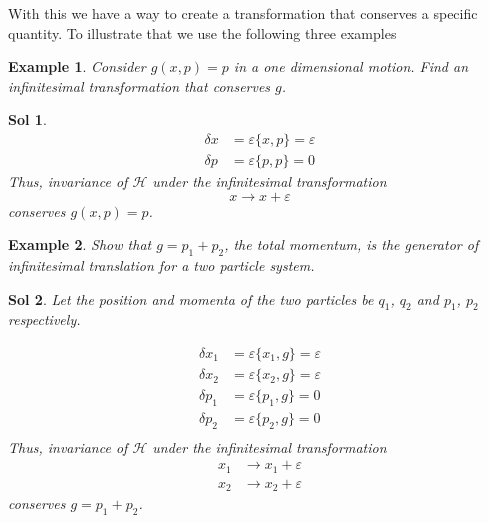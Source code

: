 \documentclass[12pt,a4paper]{report}
\newcommand{\hamiltonian}{\mathcal{H}}
\newtheorem{example}{Example}[section]
\newtheorem*{solution}{Sol}
\begin{document}
With this we have a way to create a transformation that conserves a specific quantity. To illustrate that we use the following three examples
\begin{example}
    Consider $g(x, p) = p$ in a one dimensional motion. Find an infinitesimal transformation that conserves $g$.
\end{example}
\begin{solution}
    \begin{align*}
        \delta x &= \varepsilon\{x, p\} = \varepsilon \\
        \delta p &= \varepsilon\{p, p\} = 0
    \end{align*}
    Thus, invariance of $\hamiltonian$ under the infinitesimal transformation
    \begin{equation*}
        x \to x+\varepsilon
    \end{equation*}
    conserves $g(x, p)=p$.
\end{solution}

\begin{example}
    Show that $g = p_1 + p_2$, the total momentum, is the generator of infinitesimal translation for a two particle system.
\end{example}
\begin{solution}
    Let the position and momenta of the two particles be $q_1$, $q_2$ and $p_1$, $p_2$ respectively.

    \begin{align*}
        \delta x_1 &= \varepsilon\{x_1, g\} = \varepsilon \\
        \delta x_2 &= \varepsilon\{x_2, g\} = \varepsilon \\
        \delta p_1 &= \varepsilon\{p_1, g\} = 0 \\
        \delta p_2 &= \varepsilon\{p_2, g\} = 0 \\
    \end{align*}
    Thus, invariance of $\hamiltonian$ under the infinitesimal transformation
    \begin{align*}
        x_1 &\to x_1+\varepsilon \\
        x_2 &\to x_2 + \varepsilon
    \end{align*}
    conserves $g=p_1+p_2$.
\end{solution}
\end{document}
